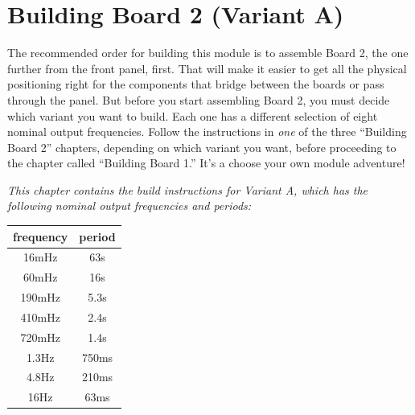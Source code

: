 
%
%
%
%
%
%

\chapter{Building Board 2 (Variant A)}

The recommended order for building this module is to assemble Board 2, the
one further from the front panel, first.  That will make it easier to get
all the physical positioning right for the components that bridge between
the boards or pass through the panel.  But before you start assembling Board
2, you must decide which variant you want to build.  Each one has a
different selection of eight nominal output frequencies.  Follow the
instructions in \emph{one} of the three ``Building Board 2'' chapters, depending on
which variant you want, before proceeding to the chapter called ``Building
Board 1.''  It's a choose your own module adventure!

\emph{This chapter contains the build instructions for Variant A, which has
the following nominal output frequencies and periods:}

\begin{tabular}{cc}
frequency & period \\ \hline
16mHz & 63s \\
60mHz & 16s \\
190mHz & 5.3s \\
410mHz & 2.4s \\
720mHz & 1.4s \\
1.3Hz & 750ms \\
4.8Hz & 210ms \\
16Hz & 63ms
\end{tabular}

